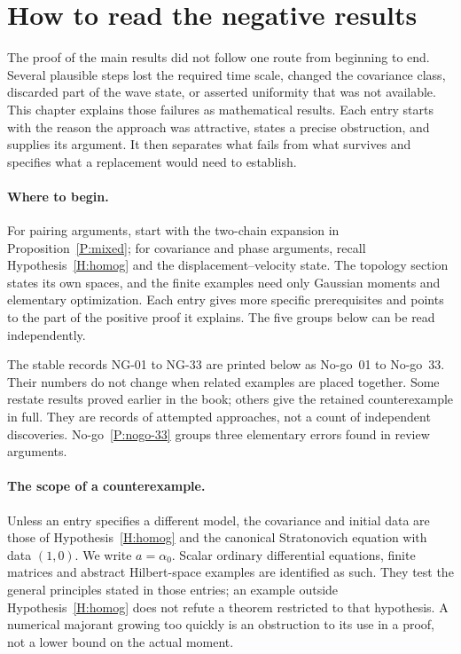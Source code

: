\section{How to read the negative results}
\label{S:nogo-guide}

The proof of the main results did not follow one route from beginning to end.
Several plausible steps lost the required time scale, changed the covariance
class, discarded part of the wave state, or asserted uniformity that was not
available. This chapter explains those failures as mathematical results.
Each entry starts with the reason the approach was attractive, states a
precise obstruction, and supplies its argument. It then separates what fails
from what survives and specifies what a replacement would need to establish.

\paragraph{Where to begin.}
For pairing arguments, start with the two-chain expansion in
Proposition~\ref{P:mixed}; for covariance and phase arguments, recall
Hypothesis~\ref{H:homog} and the displacement--velocity state. The topology
section states its own spaces, and the finite examples need only Gaussian
moments and elementary optimization. Each entry gives more specific
prerequisites and points to the part of the positive proof it explains.
The five groups below can be read independently.

The stable records NG-01 to NG-33 are printed below as No-go~01 to No-go~33.
Their numbers do not change when related examples are placed together. Some
restate results proved earlier in the book; others give the retained
counterexample in full. They are records of attempted approaches, not a count
of independent discoveries. No-go~\ref{P:nogo-33} groups three elementary
errors found in review arguments.

\paragraph{The scope of a counterexample.}
Unless an entry specifies a different model, the covariance and initial data
are those of Hypothesis~\ref{H:homog} and the canonical Stratonovich equation
with data $(1,0)$. We write $a=\alpha_0$. Scalar ordinary differential
equations, finite matrices and abstract Hilbert-space examples are identified
as such. They test the general principles stated in those entries; an example
outside Hypothesis~\ref{H:homog} does not refute a theorem restricted to that
hypothesis. A numerical majorant growing too quickly is an obstruction to its
use in a proof, not a lower bound on the actual moment.


